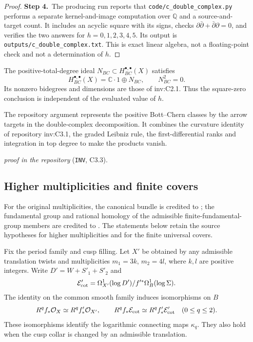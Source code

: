 \begin{proof}
\par\smallskip\noindent\textbf{Step 4.}\ The producing run reports that \texttt{code/c\_double\_complex.py} performs a separate
kernel-and-image computation over $\mathbb Q$ and a source-and-target
count.  It includes an acyclic square with its signs, checks
$\partial\bar\partial+\bar\partial\partial=0$, and verifies the
two answers for $h=0,1,2,3,4,5$.  Its output is
\texttt{outputs/c\_double\_complex.txt}.  This is exact linear
algebra, not a floating-point check and not a determination of $h$.
\end{proof}

\begin{announcement}\label{inv:C3.3}
The positive-total-degree ideal $N_{BC}\subset H^{\bullet,\bullet}_{BC}(X)$
satisfies
\[
H^{\bullet,\bullet}_{BC}(X)=\mathbb C\cdot1\oplus N_{BC},\qquad N_{BC}^2=0.
\]
Its nonzero bidegrees and dimensions are those of inv:C2.1.  Thus the
square-zero conclusion is independent of the evaluated value of $h$.
\end{announcement}

The repository argument represents the positive Bott--Chern classes by the arrow targets in the double-complex decomposition. It combines the curvature identity of repository inv:C3.1, the graded Leibniz rule, the first-differential ranks and integration in top degree to make the products vanish.
\par\noindent\emph{proof in the repository} (\texttt{INV}, C3.3).

\subsection{Higher multiplicities and finite covers}\label{sec:multiplicities-covers}

For the original multiplicities, the canonical bundle is credited to \cite[Proposition 9.11]{AC26}; the fundamental group and rational homology of the admissible finite-fundamental-group members are credited to \cite[Theorems 7.17 and 7.22]{AC26}. The statements below retain the source hypotheses for higher multiplicities and for the finite universal covers.

\begin{lemma}\label{inv:B1.1}
Fix the period family and cusp filling. Let $X'$ be obtained by any
admissible translation twists and multiplicities $m_1=3k$, $m_2=4l$,
where $k,l$ are positive integers. Write $D'=W+S'_1+S'_2$ and
\[
\mathcal E_{\rm cot}'=\Omega^1_{X'}(\log D')/f'^*\Omega^1_B(\log\Sigma).
\]
The identity on the common smooth family induces isomorphisms on $B$
\[
R^qf_*\mathcal O_X\simeq R^qf'_*\mathcal O_{X'},\qquad
R^qf_*\mathcal E_{\rm cot}\simeq R^qf'_*\mathcal E_{\rm cot}'\quad(0\le q\le2).
\]
These isomorphisms identify the logarithmic connecting maps $\kappa_q$.
They also hold when the cusp collar is changed by an admissible translation.
\end{lemma}

